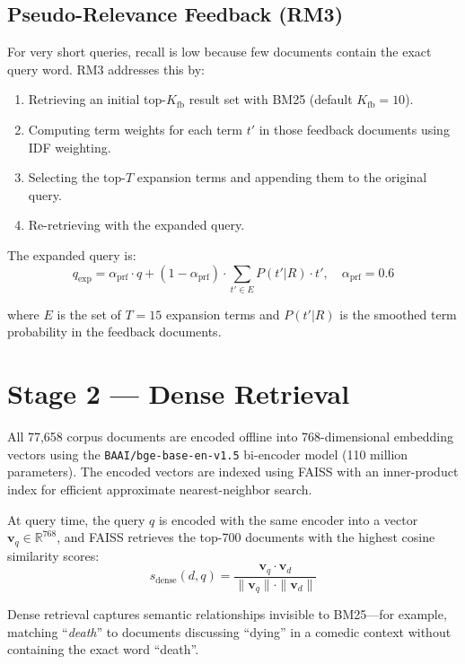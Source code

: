 \subsection{Pseudo-Relevance Feedback (RM3)}
For very short queries, recall is low because few documents contain the exact query word. RM3 \cite{rm3} addresses this by:
\begin{enumerate}
    \item Retrieving an initial top-$K_{\text{fb}}$ result set with BM25 (default $K_{\text{fb}}=10$).
    \item Computing term weights for each term $t'$ in those feedback documents using IDF weighting.
    \item Selecting the top-$T$ expansion terms and appending them to the original query.
    \item Re-retrieving with the expanded query.
\end{enumerate}

The expanded query is:
\begin{equation}
q_{\text{exp}} = \alpha_{\text{prf}} \cdot q + (1-\alpha_{\text{prf}}) \cdot \sum_{t' \in E} P(t' | R) \cdot t', \quad \alpha_{\text{prf}} = 0.6
\end{equation}

where $E$ is the set of $T=15$ expansion terms and $P(t'|R)$ is the smoothed term probability in the feedback documents.

\section{Stage 2 --- Dense Retrieval}

All 77,658 corpus documents are encoded offline into 768-dimensional embedding vectors using the \texttt{BAAI/bge-base-en-v1.5} bi-encoder model \cite{bge} (110 million parameters). The encoded vectors are indexed using FAISS \cite{faiss} with an inner-product index for efficient approximate nearest-neighbor search.

At query time, the query $q$ is encoded with the same encoder into a vector $\mathbf{v}_q \in \mathbb{R}^{768}$, and FAISS retrieves the top-700 documents with the highest cosine similarity scores:
\begin{equation}
s_{\text{dense}}(d,q) = \frac{\mathbf{v}_q \cdot \mathbf{v}_d}{\|\mathbf{v}_q\| \cdot \|\mathbf{v}_d\|}
\end{equation}

Dense retrieval captures semantic relationships invisible to BM25---for example, matching ``\textit{death}'' to documents discussing ``dying'' in a comedic context without containing the exact word ``death''.


